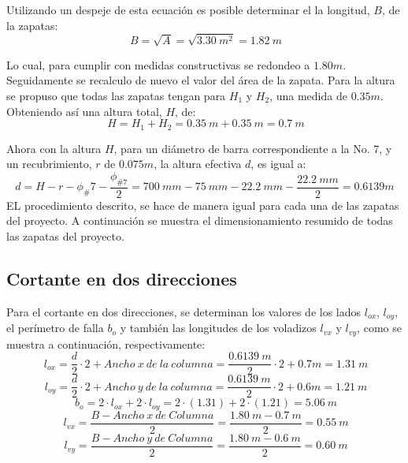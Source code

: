 \documentclass[12pt]{article}
\begin{document}
Utilizando un despeje de esta ecuación es posible determinar el la longitud, $B$, de la zapatas:
\begin{equation*}
    \ B=\sqrt{A}=\sqrt{3.30~m^2}= 1.82~m
\end{equation*}

Lo cual, para cumplir con medidas constructivas se redondeo a $1.80 m$. Seguidamente se recalculo de nuevo el valor del área de la zapata. Para la altura se propuso que todas las zapatas tengan para $H_{1}$ y $H_{2}$, una medida de $0.35 m$. Obteniendo así una altura total, $H$, de:
\begin{equation*}
    \ H=H_{1}+H_{2}=0.35~m+0.35~m=0.7~m
\end{equation*}

Ahora con la altura $H$, para un diámetro de barra correspondiente a la No. 7, y un recubrimiento, $r$ de $0.075 m$, la altura efectiva $d$, es igual a:
\begin{equation*}
     d=H-r-\phi_\#7-\frac{\phi_{\#7}}{2}=700~mm-75~mm-22.2~mm-\frac{22.2~mm}{2}=0.6139m
\end{equation*}
EL procedimiento descrito, se hace de manera igual para cada una de las zapatas del proyecto. A continuación se muestra el dimensionamiento resumido de todas las zapatas del proyecto.

\subsection{Cortante en dos direcciones}
Para el cortante en dos direcciones, se determinan los valores de los lados $l_{ox}$, $l_{oy}$, el perímetro de falla $b_{o}$ y también las longitudes de los voladizos $l_{vx}$ y $l_{vy}$, como se muestra a continuación, respectivamente:
\begin{equation*}
    \ l_{ox}= \frac{d}{2}\cdot 2 + Ancho~x~de~la~columna = \frac{0.6139~m}{2}\cdot 2 + 0.7m=1.31~m
\end{equation*}
\begin{equation*}
    \ l_{oy}= \frac{d}{2}\cdot 2 + Ancho~y~de~la~columna = \frac{0.6139~m}{2}\cdot 2 + 0.6m=1.21~m
\end{equation*}
\begin{equation*}
    \ b_{o}= 2\cdot l_{ox} + 2\cdot l_{oy}= 2\cdot(1.31)+2\cdot(1.21) =5.06~m
\end{equation*}
\begin{equation*}
    \ l_{vx}= \frac{B-Ancho~x~de~Columna}{2}= \frac{1.80~m-0.7~m}{2}=0.55~m
\end{equation*}
\begin{equation*}
    \ l_{vy}= \frac{B-Ancho~y~de~Columna}{2}= \frac{1.80~m-0.6~m}{2}=0.60~m
\end{equation*}
\end{document}
